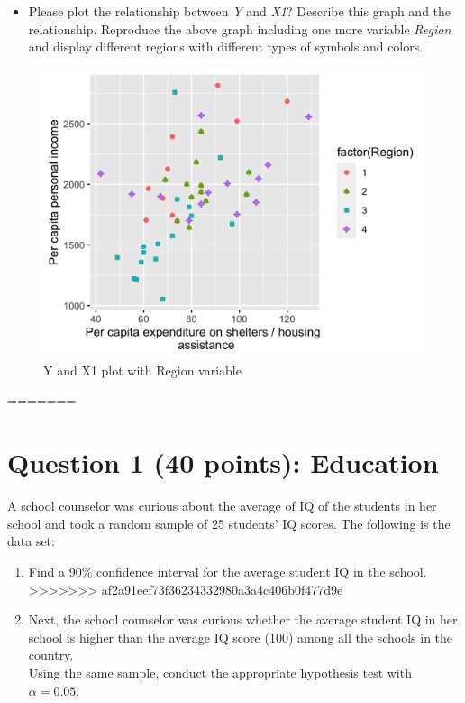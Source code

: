 \documentclass[12pt,letterpaper]{article}
\begin{document}
		\begin{itemize}
			\item 	Please plot the relationship between \emph{Y} and \emph{X1}? Describe this graph and the relationship. Reproduce the above graph including one more variable \emph{Region} and display different regions with different types of symbols and colors.
		\end{itemize}
	

\begin{figure}[H]
	\centering
	\includegraphics[width=0.7\linewidth]{../plot8}
	\caption{Y and X1 plot with Region variable}
	\label{fig:plot8}
\end{figure}

=======
	\section*{Question 1 (40 points): Education}

A school counselor was curious about the average of IQ of the students in her school and took a random sample of 25 students' IQ scores. The following is the data set:\\
\vspace{.5cm}

  

\vspace{1cm}

\begin{enumerate}
	\item Find a 90\% confidence interval for the average student IQ in the school.\\
>>>>>>> af2a91eef73f36234332980a3a4c406b0f477d9e
	
	\item Next, the school counselor was curious  whether  the average student IQ in her school is higher than the average IQ score (100) among all the schools in the country.\\ 
	
	\noindent Using the same sample, conduct the appropriate hypothesis test with $\alpha=0.05$.
\end{enumerate}
\end{document}
